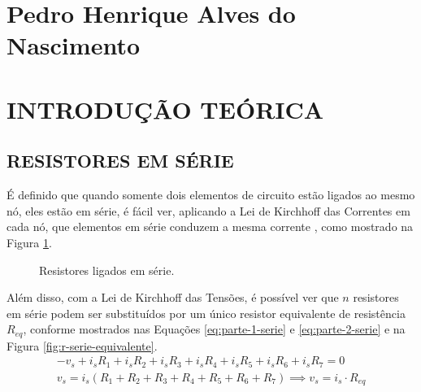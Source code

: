 \documentclass[12pt]{article}
\begin{document}
    
    
    \listoftables
    \thispagestyle{empty}
    \newpage

    \listoffigures
    \thispagestyle{empty}
    \newpage

    \tableofcontents
    \thispagestyle{empty}
    \newpage

    \section*{Pedro Henrique Alves do Nascimento}
    \section{INTRODUÇÃO TEÓRICA}
    \subsection{RESISTORES EM SÉRIE}
    É definido que quando somente dois elementos de circuito estão ligados ao mesmo nó, eles estão em série, é fácil ver, aplicando a Lei de Kirchhoff das Correntes em cada nó, que elementos em série conduzem a mesma corrente \parencite[][, p. 61]{nilsson}, como mostrado na Figura \ref{fig:r-serie}.

    \begin{figure}[H]
        \centering
        \caption{Resistores ligados em série.}
        \label{fig:r-serie}
    \end{figure}
    
    Além disso, com a Lei de Kirchhoff das Tensões, é possível ver que $n$ resistores em série podem ser substituídos por um único resistor equivalente de resistência $R_{eq}$, conforme mostrados nas Equações \ref{eq:parte-1-serie} e \ref{eq:parte-2-serie} e na Figura \ref{fig:r-serie-equivalente}.
    \begin{gather}
        -v_s+i_sR_1+i_sR_2+i_sR_3+i_sR_4+i_sR_5+i_sR_6+i_sR_7=0 \label{eq:parte-1-serie}\\
        v_s=i_s\left(R_1+R_2+R_3+R_4+R_5+R_6+R_7\right)\implies v_s=i_s\cdot R_{eq} \label{eq:parte-2-serie}
    \end{gather}
\end{document}
